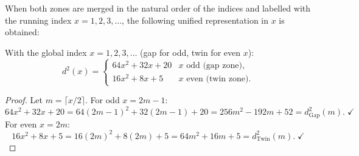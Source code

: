 When both zones are merged in the natural order of the indices
and labelled with the running index $x = 1, 2, 3, \ldots$,
the following unified representation in $x$ is obtained:

\begin{satz}
\label{satz:distanz_gesamtindex}
With the global index $x = 1, 2, 3, \ldots$ (gap for odd, twin for
even $x$):
\begin{equation}
  d^2(x) =
  \begin{cases}
    64x^2 + 32x + 20 & x \text{ odd (gap zone)}, \\[4pt]
    16x^2 + 8x + 5   & x \text{ even (twin zone)}.
  \end{cases}
\end{equation}
\end{satz}

\begin{proof}
Let $m = \lceil x/2 \rceil$. For odd $x = 2m-1$:
\[
  64x^2+32x+20
  = 64(2m-1)^2+32(2m-1)+20
  = 256m^2-192m+52
  = d_{\mathrm{Gap}}^2(m). \;\checkmark
\]
For even $x = 2m$:
\[
  16x^2+8x+5
  = 16(2m)^2+8(2m)+5
  = 64m^2+16m+5
  = d_{\mathrm{Twin}}^2(m). \;\checkmark
\]
\end{proof}

